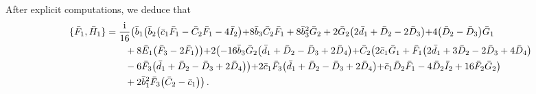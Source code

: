 \documentclass[10pt]{amsart}
\theoremstyle{definition}
\theoremstyle{corollary}
\theoremstyle{remark}
\theoremstyle{conclusion}
\begin{document}
 After explicit computations, we deduce that 
\begin{align}
    \{\bar{F}_1 , \bar{H}_1\}&=\frac{{\rm i}}{16}  \bigl(\bar{b}_1 \bigl(\bar{b}_2 \bigl(\bar{c}_1 \bar{F}_1-\bar{C}_2 \bar{F}_1-4 \bar{I}_2\bigl)+8 \bar{b}_3 \bar{C}_2 \bar{F}_1+8 \bar{b}_3^2 \bar{G}_2+2 \bar{G}_2 \bigl(2 \bar{d}_1+\bar{D}_2-2 \bar{D}_3\bigl)+4 \bigl(\bar{D}_2-\bar{D}_3\bigl) \bar{G}_1 \nonumber\\
		& \hskip 0.7cm+8 \bar{E}_1 \bigl(\bar{F}_3-2 \bar{F}_1\bigl)\bigl)+2 \bigl(-16 \bar{b}_3 \bar{G}_2 \bigl(\bar{d}_1+\bar{D}_2-\bar{D}_3+2 \bar{D}_4\bigl)+\bar{C}_2 \bigl(2 \bar{c}_1 \bar{G}_1+\bar{F}_1 \bigl(2 \bar{d}_1+3 \bar{D}_2-2 \bar{D}_3+4 \bar{D}_4\bigl) \nonumber\\
	& \hskip 0.7cm	-6 \bar{F}_3 \bigl(\bar{d}_1+\bar{D}_2-\bar{D}_3+2 \bar{D}_4\bigl)\bigl)+2 \bar{c}_1 \bar{F}_3 \bigl(\bar{d}_1+\bar{D}_2-\bar{D}_3+2 \bar{D}_4\bigl)+\bar{c}_1 \bar{D}_2 \bar{F}_1-4 \bar{D}_2 \bar{I}_2+16 \bar{F}_2 \bar{G}_2\bigl) \nonumber\\
	& \hskip 0.7cm	+2 \bar{b}_1^2 \bar{F}_3 \bigl(\bar{C}_2-\bar{c}_1\bigl)\bigl) \, .
\end{align} 
\end{document}
